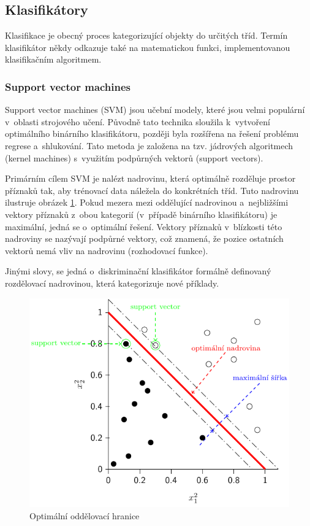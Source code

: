 \subsection{Klasifikátory}
Klasifikace je obecný proces kategorizující objekty do určitých tříd. Termín klasifikátor někdy odkazuje také na matematickou funkci, implementovanou klasifikačním algoritmem.
\subsubsection*{Support vector machines} %
Support vector machines (SVM) jsou učební modely, které jsou velmi populární v~oblasti strojového učení. Původně tato technika sloužila k~vytvoření optimálního binárního klasifikátoru, později byla rozšířena na řešení problému regrese a~shlukování. Tato metoda je založena na tzv. jádrových algoritmech (kernel machines) s~využitím podpůrných vektorů (support vectors).

Primárním cílem SVM je nalézt nadrovinu, která optimálně rozděluje prostor příznaků tak, aby trénovací data náležela do konkrétních tříd. Tuto nadrovinu ilustruje obrázek \ref{fig:svm}. Pokud mezera mezi oddělující nadrovinou a~nejbližšími vektory příznaků z~obou kategorií (v~případě binárního klasifikátoru) je maximální, jedná se o~optimální řešení. Vektory příznaků v~blízkosti této nadroviny se nazývají podpůrné vektory, což znamená, že pozice ostatních vektorů nemá vliv na nadrovinu (rozhodovací funkce). 

Jinými slovy, se jedná o~diskriminační klasifikátor formálně definovaný rozdělovací nadrovinou, která kategorizuje nové příklady.
\begin{figure}[H]
\centering
\includegraphics[width=.71\linewidth]{figures/svm.pdf}
\caption{Optimální oddělovací hranice}
\label{fig:svm}
\end{figure}

